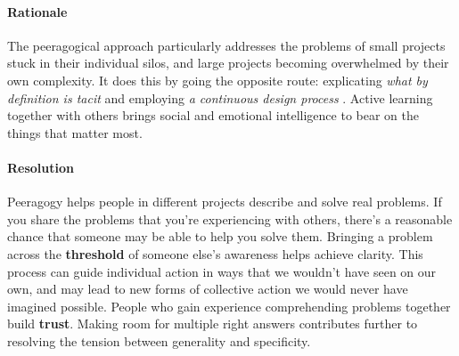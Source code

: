 \begin{refsection}
\paragraph{Rationale}
The peeragogical approach particularly addresses the problems of small projects stuck in their individual silos, and large projects becoming overwhelmed by their own complexity.  It does this by going the opposite route: explicating \emph{what by definition is tacit} and employing \emph{a continuous design process} \cite[pp. 9--10]{schummer2014beyond}.   Active learning together with others brings social and emotional intelligence to bear on the things that matter most.

\paragraph{Resolution}

Peeragogy helps people in different projects describe and solve real problems. 
If you share the problems that you're experiencing with others, there's a reasonable chance that someone may be able to help you solve them.  Bringing a problem across the \textbf{threshold} of someone else's awareness helps achieve clarity.  
This process can guide individual action in ways that we wouldn't have seen on our own, and may lead to new forms of collective action we would never have imagined possible.  People who gain experience comprehending problems together build \textbf{trust}.
%
Making room for multiple right answers contributes further to resolving the tension between generality and specificity.




\end{refsection}
